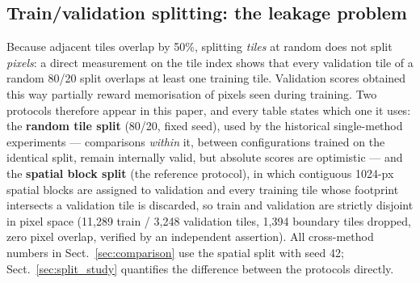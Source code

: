 \begin{table}[htbp]
\centering
\caption{Per-class positive-pixel prevalence over the full dataset (15{,}931 tiles, $1.04\times10^9$ pixels per channel). The prevalence is also the AP of an uninformative (chance-level) predictor for that class.}
\label{tab:prevalence}
\end{table}

\subsection{Train/validation splitting: the leakage problem}
\label{sec:splits}

Because adjacent tiles overlap by 50\%, splitting \emph{tiles} at random does not split \emph{pixels}: a direct measurement on the tile index shows that every validation tile of a random 80/20 split overlaps at least one training tile. Validation scores obtained this way partially reward memorisation of pixels seen during training. Two protocols therefore appear in this paper, and every table states which one it uses: the \textbf{random tile split} (80/20, fixed seed), used by the historical single-method experiments --- comparisons \emph{within} it, between configurations trained on the identical split, remain internally valid, but absolute scores are optimistic --- and the \textbf{spatial block split} (the reference protocol), in which contiguous 1024-px spatial blocks are assigned to validation and every training tile whose footprint intersects a validation tile is discarded, so train and validation are strictly disjoint in pixel space (11{,}289 train / 3{,}248 validation tiles, 1{,}394 boundary tiles dropped, zero pixel overlap, verified by an independent assertion). All cross-method numbers in Sect.~\ref{sec:comparison} use the spatial split with seed 42; Sect.~\ref{sec:split_study} quantifies the difference between the protocols directly.

